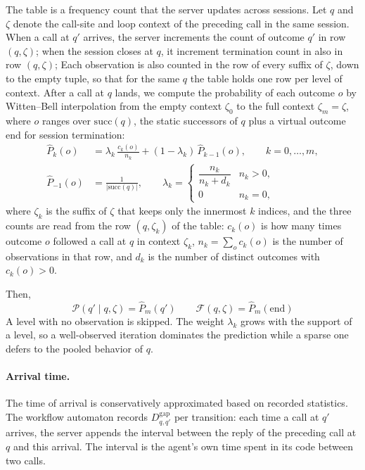 The table is a frequency count that the server updates across sessions. 
Let $q$ and $\zeta$ denote the call-site and loop context of the preceding call in the same session. When a call at $q'$ arrives, the server increments the count of outcome $q'$ in row $(q,\zeta)$; when the session closes at $q$, it increment termination count in also in row $(q,\zeta)$; Each observation is also counted in the row of every suffix of $\zeta$, down to the empty tuple, so that for the same $q$ the table holds one row per level of context. After a call at $q$ lands, we compute the probability of each outcome $o$ by Witten--Bell interpolation from the empty context $\zeta_0$ to the full context $\zeta_m=\zeta$, where $o$ ranges over $\mathrm{succ}(q)$, the static successors of $q$ plus a virtual outcome $\mathrm{end}$ for session termination:
\begin{align*}
\hat{P}_k(o) &= \lambda_k\,\frac{c_k(o)}{n_k}+(1-\lambda_k)\,\hat{P}_{k-1}(o),\qquad k=0,\dots,m, \\
\hat{P}_{-1}(o) &= \frac{1}{|\mathrm{succ}(q)|},\qquad
\lambda_k=\begin{cases}\dfrac{n_k}{n_k+d_k} & n_k>0,\\[4pt] 0 & n_k=0,\end{cases}
\end{align*}
where $\zeta_k$ is the suffix of $\zeta$ that keeps only the innermost $k$ indices, and the three counts are read from the row $(q,\zeta_k)$ of the table: $c_k(o)$ is how many times outcome $o$ followed a call at $q$ in context $\zeta_k$, $n_k=\sum_o c_k(o)$ is the number of observations in that row, and $d_k$ is the number of distinct outcomes with $c_k(o)>0$.

Then,
\[
\mathcal{P}(q'\mid q,\zeta)=\hat{P}_m(q') \qquad \mathcal{F}(q,\zeta)=\hat{P}_m(\mathrm{end})
\]
A level with no observation is skipped. The weight $\lambda_k$ grows with the support of a level, so a well-observed iteration dominates the prediction while a sparse one defers to the pooled behavior of $q$.

\paragraph{Arrival time.}
The time of arrival is conservatively approximated based on recorded statistics. The workflow automaton records $D^{\mathrm{gap}}_{q,q'}$ per transition: each time a call at $q'$ arrives, the server appends the interval between the reply of the preceding call at $q$ and this arrival. The interval is the agent's own time spent in its code between two calls. 


